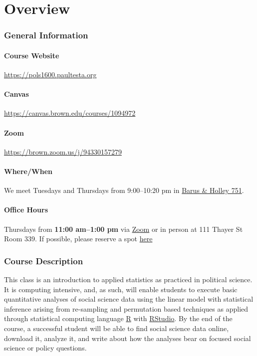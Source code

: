 
\part*{Overview}

\section{General Information}
\subsection{Course Website} \url{https://pols1600.paultesta.org}
\subsection{Canvas} \url{https://canvas.brown.edu/courses/1094972}
\subsection{Zoom} \url{https://brown.zoom.us/j/94330157279}
\subsection{Where/When}
We meet Tuesdays and Thursdays from 9:00--10:20 pm in \href{https://brown.edu/Facilities/Facilities_Management/maps/index.php#building/BH}{Barus \& Holley 751}.

\subsection{Office Hours}
 Thursdays from \textbf{11:00 am--1:00 pm} via \href{https://brown.zoom.us/j/93214880039
}{Zoom} or in person at 111 Thayer St Room 339. If possible, please reserve a spot \href{https://calendar.google.com/calendar/u/0/selfsched?sstoken=UU50c3dUNS1IVy04fGRlZmF1bHR8ZmRjZjI4YWI5YmE2YmFlZDg3ZjA4ZmFhNzcxNjdkZWY}{here}

\section{Course Description}

This class is an introduction to applied statistics as practiced in political science. It is computing intensive, and, as such, will enable students to execute basic quantitative analyses of social science data using the linear model with statistical inference arising from re-sampling and permutation based techniques as applied through statistical computing language \href{https://cran.r-project.org/}{R} with \href{https://www.rstudio.com/}{RStudio}. By the end of the course, a successful student will be able to find social science data online, download it, analyze it, and write about how the analyses bear on focused social science or policy questions.


